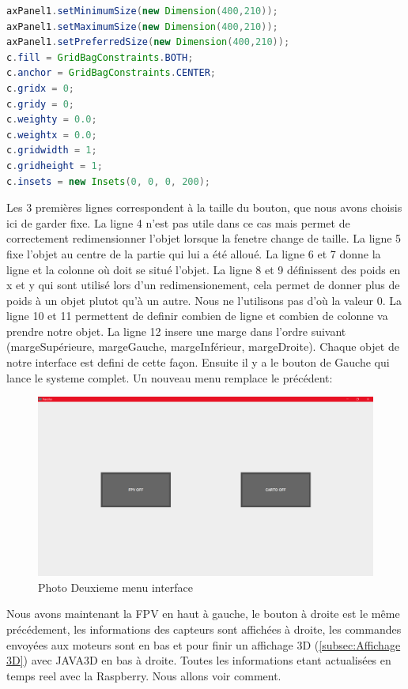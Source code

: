 \documentclass[a4paper,11pt]{report}
\begin{document}
				\begin{lstlisting}[language=java]
axPanel1.setMinimumSize(new Dimension(400,210));
axPanel1.setMaximumSize(new Dimension(400,210));
axPanel1.setPreferredSize(new Dimension(400,210));
c.fill = GridBagConstraints.BOTH;
c.anchor = GridBagConstraints.CENTER;
c.gridx = 0;
c.gridy = 0;
c.weighty = 0.0;
c.weightx = 0.0;
c.gridwidth = 1;
c.gridheight = 1;
c.insets = new Insets(0, 0, 0, 200);
				\end{lstlisting}
				Les 3 premières lignes correspondent à la taille du bouton, que nous avons choisis ici de garder fixe.
				\newline La ligne 4 n'est pas utile dans ce cas mais permet de correctement redimensionner l'objet lorsque la fenetre change de taille.
				\newline La ligne 5 fixe l'objet au centre de la partie qui lui a été alloué.
				\newline La ligne 6 et 7 donne la ligne et la colonne où doit se situé l'objet.
				\newline La ligne 8 et 9 définissent des poids en x et y qui sont utilisé lors d'un redimensionement, cela permet de donner plus de poids à un objet plutot qu'à un autre. Nous ne l'utilisons pas d'où la valeur 0.
				\newline La ligne 10 et 11 permettent de definir combien de ligne et combien de colonne va prendre notre objet.
				\newline La ligne 12 insere une marge dans l'ordre suivant (margeSupérieure, margeGauche, margeInférieur, margeDroite).
				\newline Chaque objet de notre interface est defini de cette façon.
				\newline Ensuite il y a le bouton de Gauche qui lance le systeme complet. Un nouveau menu remplace le précédent:
				\begin{figure}[!h]
					\begin{center}
						\includegraphics[scale=0.3]{Photos/Interface1.png}
						\caption{Photo Deuxieme menu interface}
					\end{center}
				\end{figure}
				\newline Nous avons maintenant la FPV en haut à gauche, le bouton à droite est le même précédement, les informations des capteurs sont affichées à droite, les commandes envoyées aux moteurs sont en bas et pour finir un affichage 3D (\ref{subsec:Affichage 3D}) avec JAVA3D en bas à droite. Toutes les informations etant actualisées en temps reel avec la Raspberry. Nous allons voir comment.
\end{document}
